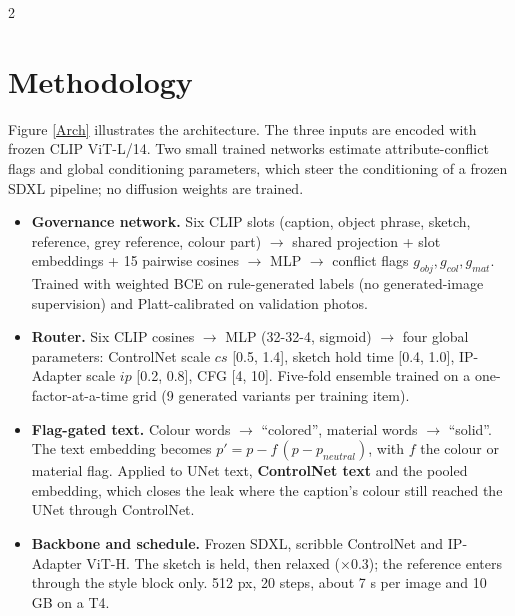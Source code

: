 \documentclass[a1,portrait]{a0poster}
\begin{document}
\begin{minipage}[c]{\linewidth}
\begin{framed}
\begin{multicols}{2}
\section*{Methodology}
Figure \ref{Arch} illustrates the architecture. The three inputs are encoded with frozen CLIP ViT-L/14. Two small trained networks estimate attribute-conflict flags and global conditioning parameters, which steer the conditioning of a frozen SDXL pipeline; no diffusion weights are trained.
\begin{itemize}
	\item \textbf{Governance network.} Six CLIP slots (caption, object phrase, sketch, reference, grey reference, colour part) $\rightarrow$ shared projection + slot embeddings + 15 pairwise cosines $\rightarrow$ MLP $\rightarrow$ conflict flags $g_{obj}, g_{col}, g_{mat}$. Trained with weighted BCE on rule-generated labels (no generated-image supervision) and Platt-calibrated on validation photos.
	\item \textbf{Router.} Six CLIP cosines $\rightarrow$ MLP (32-32-4, sigmoid) $\rightarrow$ four global parameters: ControlNet scale $cs$ [0.5, 1.4], sketch hold time [0.4, 1.0], IP-Adapter scale $ip$ [0.2, 0.8], CFG [4, 10]. Five-fold ensemble trained on a one-factor-at-a-time grid (9 generated variants per training item).
	\item \textbf{Flag-gated text.} Colour words $\rightarrow$ ``colored'', material words $\rightarrow$ ``solid''. The text embedding becomes $p' = p - f\,(p - p_{neutral})$, with $f$ the colour or material flag. Applied to UNet text, \textbf{ControlNet text} and the pooled embedding, which closes the leak where the caption's colour still reached the UNet through ControlNet.
	\item \textbf{Backbone and schedule.} Frozen SDXL, scribble ControlNet and IP-Adapter ViT-H. The sketch is held, then relaxed ($\times$0.3); the reference enters through the style block only. 512 px, 20 steps, about 7 s per image and 10 GB on a T4.
\end{itemize}

\color{Black}

\end{multicols}
\end{framed}
\end{minipage}
\end{document}
